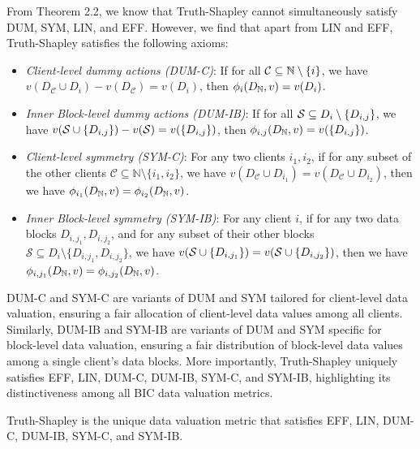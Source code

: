 From Theorem 2.2, we know that Truth-Shapley cannot simultaneously satisfy DUM, SYM, LIN, and EFF. 
However, we find that apart from LIN and EFF, Truth-Shapley satisfies the following axioms:
\begin{itemize}[leftmargin=*]
    \item \textit{Client-level dummy actions (DUM-C)}: If for all $\mathcal{C}\subseteq \mathbb{N} \setminus \set[i]$, we have $v(D_{\mathcal{C}}\cup D_{i}) - v(D_{\mathcal{C}}) = v(D_{i})$, then $\phi_{i}(\granddataset, v) = v(D_{i})$.
    \item \textit{Inner Block-level dummy actions (DUM-IB)}: If for all $\mathcal{S}\subseteq D_{i} \setminus \set[D_{i,j}]$, we have $v(\mathcal{S}\cup \set[D_{i,j}]) - v(\mathcal{S}) = v(\set[D_{i,j}])$, then $\phi_{i,j}(\granddataset, v) = v(\set[D_{i,j}])$.
    \item \textit{Client-level symmetry (SYM-C)}: For any two clients $i_1, i_2$, if for any subset of the other clients $\mathcal{C} \subseteq \mathbb{N} \setminus \{i_1, i_2 \}$, we have $v(D_{\mathcal{C}} \cup D_{i_1}) = v(D_{\mathcal{C}} \cup D_{i_2})$, then we have $\phi_{i_1}(\granddataset, v) =\phi_{i_2}(\granddataset, v)$.
    \item \textit{Inner Block-level symmetry (SYM-IB)}: For any client $i$, if for any two data blocks $D_{i, j_1}, D_{i, j_2}$, and for any subset of their other blocks $\mathcal{S} \subseteq D_i \setminus \{D_{i, j_1}, D_{i, j_2} \}$, we have $v(\mathcal{S} \cup \set[D_{i, j_1}]) = v(\mathcal{S} \cup \set[D_{i, j_2}])$, then we have $\phi_{i, j_1}(\granddataset, v) =\phi_{i, j_2}(\granddataset, v)$.
\end{itemize}
DUM-C and SYM-C are variants of DUM and SYM tailored for client-level data valuation, ensuring a fair allocation of client-level data values among all clients. 
Similarly, DUM-IB and SYM-IB are variants of DUM and SYM specific for block-level data valuation, ensuring a fair distribution of block-level data values among a single client's data blocks.
More importantly, Truth-Shapley uniquely satisfies EFF, LIN, DUM-C, DUM-IB, SYM-C, and SYM-IB, highlighting its distinctiveness among all BIC data valuation metrics.

\begin{theorem}
\label{thm:tsv_unique}
    Truth-Shapley is the unique data valuation metric that satisfies EFF, LIN, DUM-C, DUM-IB, SYM-C, and SYM-IB.
\end{theorem}

